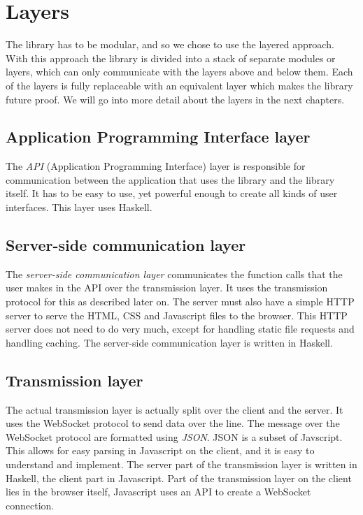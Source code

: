 \documentclass[11pt]{article}
\begin{document}
\newpage
\section{Layers}

The library has to be modular, and so we chose to use the layered approach.
With this approach the library is divided into a stack of separate modules or layers, which can only communicate with the layers above and below them.
Each of the layers is fully replaceable with an equivalent layer which makes the library future proof.
We will go into more detail about the layers in the next chapters.

\subsection{Application Programming Interface layer}

The \textit{API} (Application Programming Interface) layer is responsible for communication between the application that uses the library and the library itself.
It has to be easy to use, yet powerful enough to create all kinds of user interfaces.
This layer uses Haskell.


\subsection{Server-side communication layer}

The \textit{server-side communication layer} communicates the function calls that the user makes in the API over the transmission layer.
It uses the transmission protocol for this as described later on.
The server must also have a simple HTTP server to serve the HTML, CSS and Javascript files to the browser.
This HTTP server does not need to do very much, except for handling static file requests and handling caching.
The server-side communication layer is written in Haskell.

\subsection{Transmission layer}

The actual transmission layer is actually split over the client and the server.
It uses the WebSocket protocol to send data over the line.
The message over the WebSocket protocol are formatted using \textit{JSON}.
JSON is a subset of Javscript.
This allows for easy parsing in Javascript on the client, and it is easy to understand and implement.
The server part of the transmission layer is written in Haskell, the client part in Javascript.
Part of the transmission layer on the client lies in the browser itself, Javascript uses an API to create a WebSocket connection.
\end{document}
